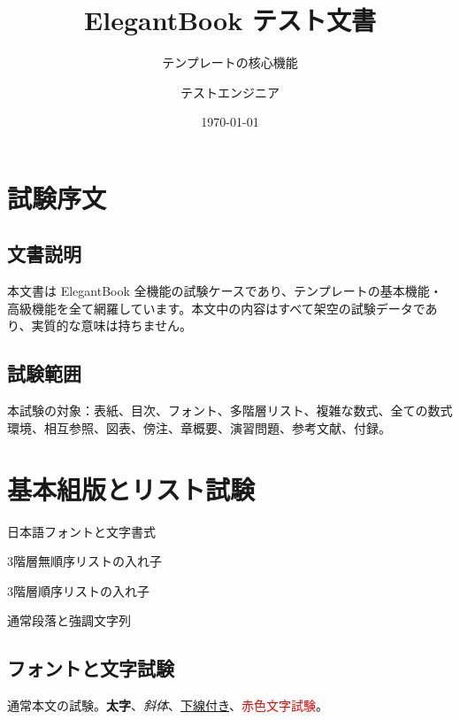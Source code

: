 \documentclass[jp]{../../elegantbook}
\title{ElegantBook テスト文書}
\subtitle{テンプレートの核心機能}
\author{テストエンジニア}
\institute{テンプレート試験グループ}
\date{\today}
\begin{document}
\maketitle
\frontmatter
\tableofcontents

\setcounter{page}{0}
\chapter*{試験序文}
\section*{文書説明}
本文書は ElegantBook 全機能の試験ケースであり、テンプレートの基本機能・高級機能を全て網羅しています。本文中の内容はすべて架空の試験データであり、実質的な意味は持ちません。
\newpage
\section*{試験範囲}
本試験の対象：表紙、目次、フォント、多階層リスト、複雑な数式、全ての数式環境、相互参照、図表、傍注、章概要、演習問題、参考文献、付録。

\mainmatter

\chapter{基本組版とリスト試験}
\begin{introduction}[本章試験項目]
\item 日本語フォントと文字書式
\item 3階層無順序リストの入れ子
\item 3階層順序リストの入れ子
\item 通常段落と強調文字列
\end{introduction}

\section{フォントと文字試験}
通常本文の試験。\textbf{太字}、\textit{斜体}、\underline{下線付き}、\textcolor{red}{赤色文字試験}。
\end{document}

